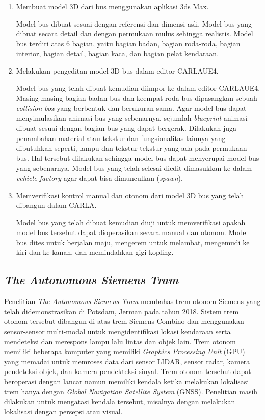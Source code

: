 \begin{enumerate}

    \item Membuat model 3D dari bus menggunakan aplikasi 3ds Max.

    Model bus dibuat sesuai dengan referensi dan dimensi asli. Model bus yang
    dibuat secara detail dan dengan permukaan mulus sehingga realistis. Model
    bus terdiri atas 6 bagian, yaitu bagian badan, bagian roda-roda, bagian
    interior, bagian detail, bagian kaca, dan bagian pelat kendaraan.

    \item Melakukan pengeditan model 3D bus dalam editor CARLAUE4.

    Model bus yang telah dibuat kemudian diimpor ke dalam editor CARLAUE4.
    Masing-masing bagian badan bus dan keempat roda bus dipasangkan sebuah
    \textit{collision box} yang berbentuk dan berukuran sama. Agar model bus
    dapat menyimulasikan animasi bus yang sebenarnya, sejumlah
    \textit{blueprint} animasi dibuat sesuai dengan bagian bus yang dapat
    bergerak. Dilakukan juga penambahan material atau tekstur dan fungsionalitas
    lainnya yang dibutuhkan seperti, lampu dan tekstur-tekstur yang ada pada
    permukaan bus. Hal tersebut dilakukan sehingga model bus dapat menyerupai
    model bus yang sebenarnya. Model bus yang telah selesai diedit dimasukkan ke
    dalam \textit{vehicle factory} agar dapat bisa dimunculkan (\textit{spawn}).

    \item Memverifikasi kontrol manual dan otonom dari model 3D bus yang telah
    dibangun dalam CARLA.

    Model bus yang telah dibuat kemudian diuji untuk memverifikasi apakah model
    bus tersebut dapat dioperasikan secara manual dan otonom. Model bus dites
    untuk berjalan maju, mengerem untuk melambat, mengemudi ke kiri dan ke
    kanan, dan memindahkan gigi kopling.

\end{enumerate}

\subsection{\textit{The Autonomous Siemens Tram} \parencite{at-palmer}}

Penelitian \textit{The Autonomous Siemens Tram} membahas trem otonom Siemens
yang telah didemonstrasikan di Potsdam, Jerman pada tahun 2018. Sistem trem
otonom tersebut dibangun di atas trem Siemens Combino dan menggunakan
sensor-sensor multi-modal untuk mengidentifikasi lokasi kendaraan serta
mendeteksi dan merespons lampu lalu lintas dan objek lain. Trem otonom memiliki
beberapa komputer yang memiliki \textit{Graphics Processing Unit} (GPU) yang
memadai untuk memroses data dari sensor LIDAR, sensor radar, kamera pendeteksi
objek, dan kamera pendekteksi sinyal. Trem otonom tersebut dapat beroperasi
dengan lancar namun memiliki kendala ketika melakukan lokalisasi trem hanya
dengan \textit{Global Navigation Satellite System} (GNSS). Penelitian masih
dilakukan untuk mengatasi kendala tersebut, misalnya dengan melakukan lokalisasi
dengan persepsi atau visual.
